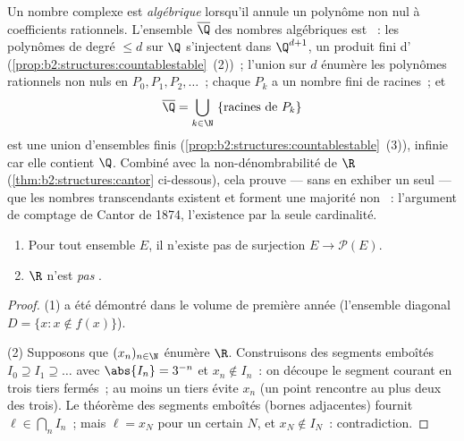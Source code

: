 \begin{example}\label{ex:b2:structures:algebraic}
Un nombre complexe est \emph{algébrique} lorsqu'il annule un
polynôme non nul à coefficients rationnels. L'ensemble
$\overline\Q$ des nombres algébriques est ~: les
polynômes de degré $\leq d$ sur $\Q$ s'injectent dans $\Q^{d+1}$,
un produit fini d'
(\cref{prop:b2:structures:countablestable}~(2))~; l'union sur
$d$ énumère les polynômes rationnels non nuls en $P_0, P_1,
P_2, \dots$~; chaque $P_k$ a un nombre fini de racines~; et
\[
\overline\Q = \bigcup_{k \in \N}\ \{\text{racines de } P_k\}
\]
est une union  d'ensembles finis
(\cref{prop:b2:structures:countablestable}~(3)), infinie car
elle contient $\Q$. Combiné avec la non-dénombrabilité de $\R$
(\cref{thm:b2:structures:cantor} ci-dessous), cela prouve --- sans
en exhiber un seul --- que les nombres transcendants existent
et forment une majorité non ~: l'argument de comptage
de Cantor de 1874, l'existence par la seule cardinalité.
\end{example}

\begin{theorem}\label{thm:b2:structures:cantor}
\begin{enumerate}
  \item Pour tout ensemble $E$, il n'existe pas de surjection $E \to
        \mathcal{P}(E)$.
  \item $\R$ n'est \emph{pas} .
\end{enumerate}
\end{theorem}

\begin{proof}
(1) a été démontré dans le volume de première année (l'ensemble
diagonal $D = \{x : x \notin f(x)\}$).

(2) Supposons que $(x_n)_{n \in \N}$ énumère $\R$. Construisons des
segments emboîtés $I_0 \supseteq I_1 \supseteq \dots$ avec $\abs{I_n}
= 3^{-n}$ et $x_n \notin I_n$~: on découpe le segment courant en trois
tiers fermés~; au moins un tiers évite $x_n$ (un point rencontre au
plus deux des trois). Le théorème des segments emboîtés (bornes
adjacentes) fournit $\ell \in \bigcap_n I_n$~; mais $\ell = x_N$ pour
un certain $N$, et $x_N \notin I_N$~: contradiction.
\end{proof}

